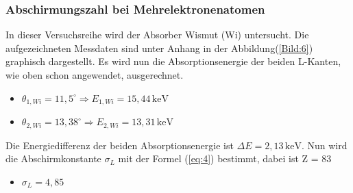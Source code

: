 \subsubsection{Abschirmungszahl bei Mehrelektronenatomen}
In dieser Versuchsreihe wird der Absorber Wismut (Wi) untersucht.
Die aufgezeichneten Messdaten sind unter Anhang in der Abbildung(\ref{Bild:6}) graphisch dargestellt.
Es wird nun die Absorptionsenergie der beiden L-Kanten, wie oben schon angewendet, ausgerechnet.
\begin{itemize}
  \item $\theta_{1,Wi} = 11,5^\circ \Rightarrow E_{1,Wi} = 15,44 \,\text{keV}$
  \item $\theta_{2,Wi} = 13,38^\circ \Rightarrow E_{2,Wi} = 13,31 \,\text{keV}$
\end{itemize}
Die Energiedifferenz der beiden Absorptionsenergie ist $\Delta E = 2,13 \,\text{keV}$.
Nun wird die Abschirmkonstante $\sigma_L$ mit der Formel (\ref{eq:4}) bestimmt, dabei ist Z = 83
\begin{itemize}
  \item $\sigma_L = 4,85 $
\end{itemize}
